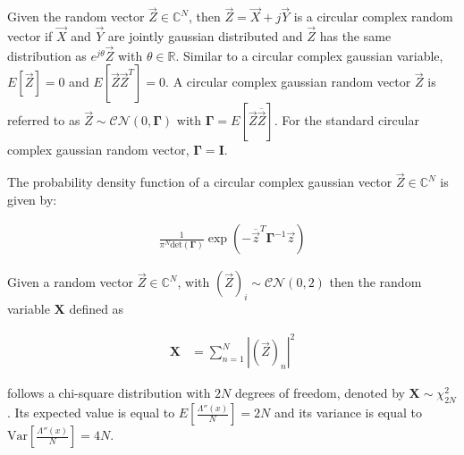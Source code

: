 \documentclass[a4paper, openany, oneside]{memoir}
\begin{document}
\begin{blockDefinition}
Given the random vector $\vec{Z} \in \mathbb{C}^N$, then $\vec{Z} = \vec{X} + j\vec{Y}$ is a circular complex random vector if $\vec{X}$ and $\vec{Y}$ are jointly gaussian distributed and $\vec{Z}$ has the same distribution as $e^{j\theta}\vec{Z}$ with $\theta \in \mathbb{R}$. Similar to a circular complex gaussian variable, $E\left[\vec{Z}\right] = 0$
and $E\left[\vec{Z}\vec{Z}^T\right] = 0$. A circular complex gaussian random vector $\vec{Z}$ is referred to as $\vec{Z} \sim \mathcal{CN}(0,\mathbf{\Gamma})$ with $\mathbf{\Gamma} = E\left[\vec{Z}\overline{\vec{Z}} \right]$. For the standard circular complex gaussian random vector, $\mathbf{\Gamma} = \mathbf{I}$. 

The probability density function of a circular complex gaussian vector $\vec{Z}\in \mathbb{C}^N$ is given by:

\begin{align*}
	\frac{1}{\pi^N \text{det}(\mathbf{\Gamma})} \exp \left(-\overline{\vec{z}}^T \mathbf{\Gamma}^{-1}\vec{z}\right)
\end{align*}
\end{blockDefinition}

\begin{blockDefinition}
Given a random vector $\vec{Z} \in \mathbb{C}^N$, with $(\vec{Z})_i \sim \mathcal{CN}(0, 2)$ then the random variable $\mathbf{X}$ defined as

\begin{align*}
	\mathbf{X} &= \sum_{n=1}^N \left|(\vec{Z})_n\right|^2 %
\end{align*}






follows a chi-square distribution with $2N$ degrees of freedom, denoted by $\mathbf{X} \sim \chi^2_{2N}$.
Its expected value is equal to $E[\frac{\Lambda''(x)}{N}] = 2N$ and its variance is equal to $\text{Var}[\frac{\Lambda''(x)}{N}] = 4N$.
\end{blockDefinition}
\end{document}
